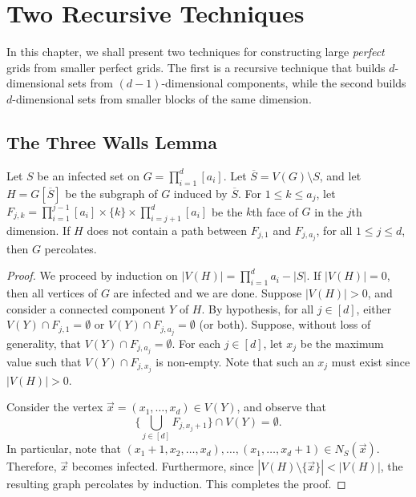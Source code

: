 \chapter{Two Recursive Techniques}

In this chapter, we shall present two techniques for constructing large \emph{perfect} grids from smaller perfect grids. The first is a recursive technique that builds $d$-dimensional sets from $(d-1)$-dimensional components, while the second builds $d$-dimensional sets from smaller blocks of the same dimension. 

\section{The Three Walls Lemma}

\begin{lem}
\label{lem:walls}
Let $S$ be an infected set on $G = \prod_{i=1}^d [a_i]$. Let $\overline{S} = V(G) \setminus S$, and let $H = G[\overline{S}]$ be the subgraph of $G$ induced by $\overline{S}$. For $1 \leq k \leq a_j$, let $F_{j,k} = \prod_{i=1}^{j-1} [a_i] \times \{k\} \times \prod_{i=j+1}^{d} [a_i]$ be the $k$th face of $G$ in the $j$th dimension. If $H$ does not contain a path between $F_{j,1}$ and $F_{j,a_j}$, for all $1 \leq j \leq d$, then $G$ percolates.
\end{lem}

\begin{proof}
We proceed by induction on $|V(H)| = \prod_{i=1}^d a_i - |S|$. If $|V(H)| = 0$, then all vertices of $G$ are infected and we are done. Suppose $|V(H)| > 0$, and consider a connected component $Y$ of $H$. By hypothesis, for all $j \in [d]$, either $V(Y) \cap F_{j,1} = \emptyset$ or $V(Y) \cap F_{j,a_j} = \emptyset$ (or both). Suppose, without loss of generality, that $V(Y) \cap F_{j,a_j} = \emptyset$.
For each $j \in [d]$, let $x_j$ be the maximum value such that $V(Y) \cap F_{j,x_j}$ is non-empty. Note that such an $x_j$ must exist since $|V(H)| > 0$. 

Consider the vertex $\vec{x} = (x_1, \dots, x_d) \in V(Y)$, and observe that 
$$\{\bigcup_{j \in [d]} F_{j,x_j+1}\} \cap  V(Y) = \emptyset.$$
In particular, note that $(x_1+1, x_2, \dots, x_d), \dots, (x_1, \dots, x_d+1) \in N_S(\vec{x})$. Therefore, $\vec{x}$ becomes infected. Furthermore, since $|V(H) \setminus \{\vec{x}\}| < |V(H)|$, the resulting graph percolates by induction. This completes the proof.
\end{proof}

